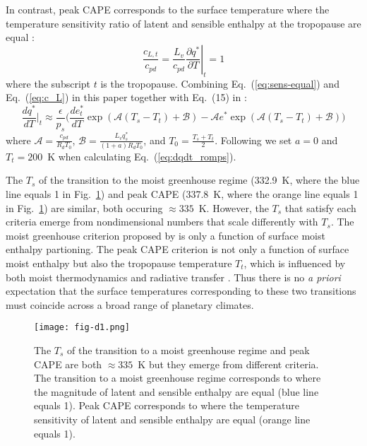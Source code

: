 \documentclass[]{ametsocV6.1}
\begin{document}
In contrast, peak CAPE corresponds to the surface temperature where the temperature sensitivity ratio of latent and sensible enthalpy at the tropopause are equal \citep[which works well for $a\ll1$,][]{romps2016}:
\begin{equation}
\frac{c_{L,t}}{c_{pd}} = \frac{L_v}{c_{pd}} \left. \frac{\partial q^*}{\partial T} \right|_t = 1
\label{eq:sens-equal}
\end{equation}
where the subscript $t$ is the tropopause. Combining Eq.~(\ref{eq:sens-equal}) and Eq.~(\ref{eq:c_L}) in this paper together with Eq.~(15) in \cite{romps2016}:
\begin{equation}
\frac{d q^*}{d T} \biggl|_t \approx \frac{\epsilon}{p_s} \biggl( \frac{d e_t^*}{d T} \exp( \mathcal{A} (T_s - T_t) + \mathcal{B}) - \mathcal{A} e^* \exp( \mathcal{A} (T_s - T_t) + \mathcal{B}) \biggl)
\label{eq:dqdt_romps}
\end{equation}
where $\mathcal{A} = \frac{c_{pd}}{R_d T_0}$, $\mathcal{B} = \frac{L_v q_s^*}{(1 + a) R_d T_0}$, and $T_0 = \frac{T_s + T_t}{2}$. Following \cite{romps2016} we set $a=0$ and $T_t=200$~K when calculating Eq.~(\ref{eq:dqdt_romps}).

The $T_s$ of the transition to the moist greenhouse regime (332.9~K, where the blue line equals 1 in Fig.~\ref{fig:fig-d1}) and peak CAPE (337.8~K, where the orange line equals 1 in Fig.~\ref{fig:fig-d1}) are similar, both occuring $\approx335$~K. However, the $T_s$ that satisfy each criteria emerge from nondimensional numbers that scale differently with $T_s$. The moist greenhouse criterion proposed by \cite{wordsworth2013} is only a function of surface moist enthalpy partioning. The peak CAPE criterion is not only a function of surface moist enthalpy but also the tropopause temperature $T_t$, which is influenced by both moist thermodynamics and radiative transfer \citep[e.g.,][]{held1982, hu2019a}. Thus there is no \textit{a priori} expectation that the surface temperatures corresponding to these two transitions must coincide across a broad range of planetary climates.

\begin{figure}[htbp]
 \centering
 \texttt{[image: fig-d1.png]}
 \caption{The $T_s$ of the transition to a moist greenhouse regime and peak CAPE are both $\approx 335$~K but they emerge from different criteria. The transition to a moist greenhouse regime corresponds to where the magnitude of latent and sensible enthalpy are equal (blue line equals 1). Peak CAPE corresponds to where the temperature sensitivity of latent and sensible enthalpy are equal (orange line equals 1).}\label{fig:fig-d1}
\end{figure}

\clearpage




\end{document}
